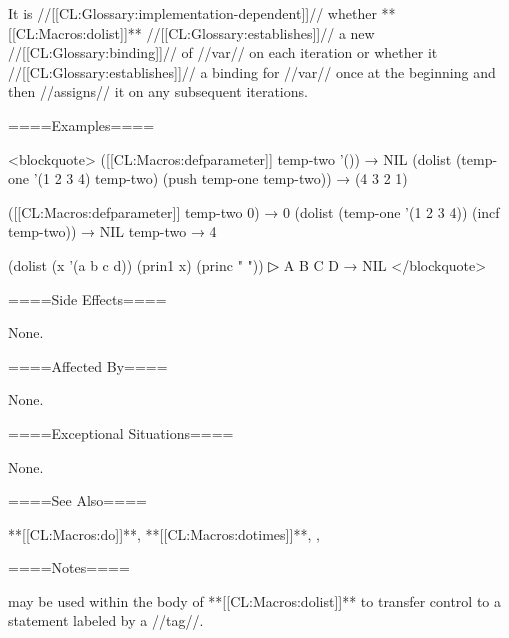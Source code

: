 It is //[[CL:Glossary:implementation-dependent]]// whether **[[CL:Macros:dolist]]** //[[CL:Glossary:establishes]]// a new //[[CL:Glossary:binding]]// of //var// on each iteration or whether it //[[CL:Glossary:establishes]]// a binding for //var// once at the beginning and then //assigns// it on any subsequent iterations.

====Examples====

<blockquote> ([[CL:Macros:defparameter]] temp-two '()) → NIL (dolist (temp-one '(1 2 3 4) temp-two) (push temp-one temp-two)) → (4 3 2 1)

([[CL:Macros:defparameter]] temp-two 0) → 0 (dolist (temp-one '(1 2 3 4)) (incf temp-two)) → NIL temp-two → 4

(dolist (x '(a b c d)) (prin1 x) (princ " "))
▷ A B C D → NIL </blockquote>

====Side Effects====

None.

====Affected By====

None.

====Exceptional Situations====

None.

====See Also====

**[[CL:Macros:do]]**, **[[CL:Macros:dotimes]]**, ,

{\secref\TraversalRules}

====Notes====

 may be used within the body of **[[CL:Macros:dolist]]** to transfer control to a statement labeled by a //tag//.

 
